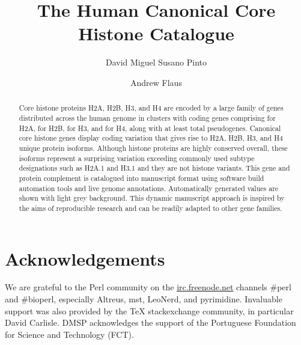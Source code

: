 \documentclass[a4paper,oneside,onecolumn,article,draft]{memoir}
\title{The Human Canonical Core Histone Catalogue}
\author[1]{David Miguel Susano Pinto}
\author[1]{Andrew Flaus}
\affil[1]{Centre for Chromosome Biology, School of Natural Sciences,
  National University of Ireland Galway, Galway, Ireland}
\begin{document}
  \maketitle

  \begin{abstract}
    Core histone proteins H2A, H2B, H3, and H4 are encoded
    by a large family of genes distributed across the human genome
    in \TotalCoreCodingGenes{} clusters
    with \TotalCoreCodingGenes{} coding genes comprising
    \HTwoACodingGenes{} for H2A,
    \HTwoBCodingGenes{} for H2B,
    \HThreeCodingGenes{} for H3,
    and \HFourCodingGenes{} for H4,
    along with at least \TotalCorePseudoGenes{} total pseudogenes.
    Canonical core histone genes display coding variation that gives rise to
    \HTwoAUniqueProteins{} H2A, \HTwoBUniqueProteins{} H2B,
    \HThreeUniqueProteins{} H3, and \HFourUniqueProteins{} H4
    unique protein isoforms.
    Although histone proteins are highly conserved overall,
    these isoforms represent a surprising variation
    exceeding commonly used subtype designations
    such as H2A.1 and H3.1 and they are not histone variants.
    This gene and protein complement is catalogued into manuscript format
    using software build automation tools and live genome annotations.
    Automatically generated values are shown with light grey background.
    This dynamic manuscript approach is inspired
    by the aims of reproducible research
    and can be readily adapted to other gene families.
  \end{abstract}

  
  
  
  
  
  
  

  \section{Acknowledgements}
    We are grateful to the Perl community on the \url{irc.freenode.net}
    channels \#perl and \#bioperl,
    especially Altreus, mst, LeoNerd, and pyrimidine.
    Invaluable support was also provided by the \TeX{} stackexchange community,
    in particular David Carlisle.
    DMSP acknowledges the support of the Portuguese Foundation for
    Science and Technology (FCT).

  

  \newpage
  \appendix
  
\end{document}
